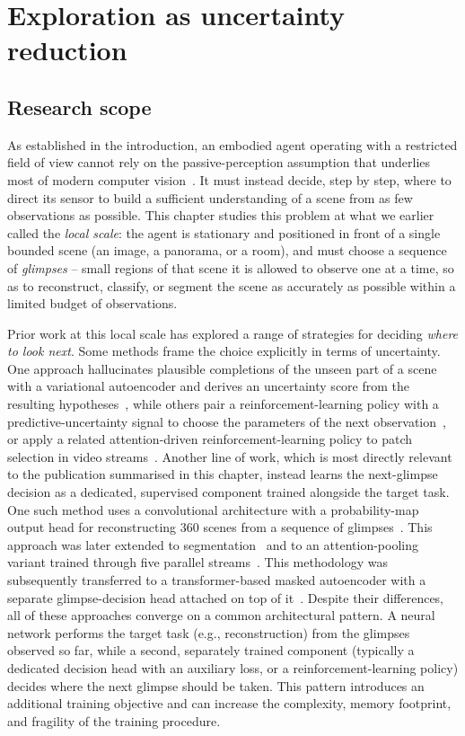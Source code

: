 \chapter{Exploration as uncertainty reduction}
\label{chap:uncertainty}

\section{Research scope}
\label{sec:uncertainty-scope}

As established in the introduction, an embodied agent operating with a restricted field of view cannot rely on the passive-perception assumption that underlies most of modern computer vision~\cite{girdhar2022omnivore}. It must instead decide, step by step, where to direct its sensor to build a sufficient understanding of a scene from as few observations as possible. This chapter studies this problem at what we earlier called the \emph{local scale}: the agent is stationary and positioned in front of a single bounded scene (an image, a panorama, or a room), and must choose a sequence of \emph{glimpses} -- small regions of that scene it is allowed to observe one at a time, so as to reconstruct, classify, or segment the scene as accurately as possible within a limited budget of observations.

Prior work at this local scale has explored a range of strategies for deciding \emph{where to look next}. Some methods frame the choice explicitly in terms of uncertainty. One approach hallucinates plausible completions of the unseen part of a scene with a variational autoencoder and derives an uncertainty score from the resulting hypotheses~\cite{samrudhdhi2021vae1}, while others pair a reinforcement-learning policy with a predictive-uncertainty signal to choose the parameters of the next observation~\cite{jayaraman2017rl1,ramakrishnan2018rl3}, or apply a related attention-driven reinforcement-learning policy to patch selection in video streams~\cite{chai2019rl2}. Another line of work, which is most directly relevant to the publication summarised in this chapter, instead learns the next-glimpse decision as a dedicated, supervised component trained alongside the target task. One such method uses a convolutional architecture with a probability-map output head for reconstructing 360\textdegree{} scenes from a sequence of glimpses~\cite{seifi2019wheretolooknext}. This approach was later extended to segmentation~\cite{seifi2020segment} and to an attention-pooling variant trained through five parallel streams~\cite{seifi2021glimpse}. This methodology was subsequently transferred to a transformer-based masked autoencoder with a separate glimpse-decision head attached on top of it~\cite{Jha2023WACV}. Despite their differences, all of these approaches converge on a common architectural pattern. A neural network performs the target task (e.g., reconstruction) from the glimpses observed so far, while a second, separately trained component (typically a dedicated decision head with an auxiliary loss, or a reinforcement-learning policy) decides where the next glimpse should be taken. This pattern introduces an additional training objective and can increase the complexity, memory footprint, and fragility of the training procedure.

